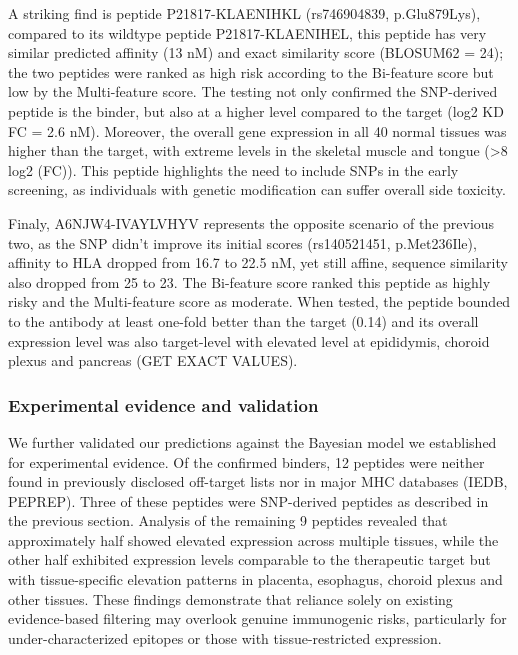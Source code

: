 \documentclass[unnumsec,webpdf,contemporary,large]{oup-authoring-template}%
\theoremstyle{thmstyleone}%
\theoremstyle{thmstyletwo}%
\theoremstyle{thmstylethree}%
\begin{document}
            A striking find is peptide P21817-KLAENIHKL (rs746904839, p.Glu879Lys), compared to its wildtype peptide P21817-KLAENIHEL, this peptide has very similar predicted affinity (13 nM) and exact similarity score (BLOSUM62 = 24); the two peptides were ranked as high risk according to the Bi-feature score but low by the Multi-feature score. The testing not only confirmed the SNP-derived peptide is the binder, but also at a higher level compared to the target (log2 KD FC = 2.6 nM). Moreover, the overall gene expression in all 40 normal tissues was higher than the target, with extreme levels in the skeletal muscle and tongue (>8 log2 (FC)). This peptide highlights the need to include SNPs in the early screening, as individuals with genetic modification can suffer overall side toxicity.
            
            Finaly, A6NJW4-IVAYLVHYV represents the opposite scenario of the previous two, as the SNP didn’t improve its initial scores (rs140521451, p.Met236Ile), affinity to HLA dropped from 16.7 to 22.5 nM, yet still affine, sequence similarity also dropped from 25 to 23. The Bi-feature score ranked this peptide as highly risky and the Multi-feature score as moderate. When tested, the peptide bounded to the antibody at least one-fold better than the target (0.14) and its overall expression level was also target-level with elevated level at epididymis, choroid plexus and pancreas (GET EXACT VALUES). 

            \subsubsection{\textbf{Experimental evidence and validation}}
                We further validated our predictions against the Bayesian model we established for experimental evidence. Of the confirmed binders, 12 peptides were neither found in previously disclosed off-target lists nor in major MHC databases (IEDB, PEPREP). Three of these peptides were SNP-derived peptides as described in the previous section. Analysis of the remaining 9 peptides revealed that approximately half showed elevated expression across multiple tissues, while the other half exhibited expression levels comparable to the therapeutic target but with tissue-specific elevation patterns in placenta, esophagus, choroid plexus and other tissues. These findings demonstrate that reliance solely on existing evidence-based filtering may overlook genuine immunogenic risks, particularly for under-characterized epitopes or those with tissue-restricted expression.
\end{document}
